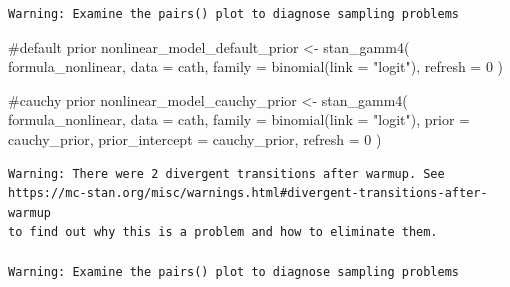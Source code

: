 \documentclass[
  letterpaper,
  DIV=11,
  numbers=noendperiod]{scrartcl}
\newenvironment{Shaded}{\begin{snugshade}}{\end{snugshade}}
\newcommand{\AttributeTok}[1]{\textcolor[rgb]{0.40,0.45,0.13}{#1}}
\newcommand{\CommentTok}[1]{\textcolor[rgb]{0.37,0.37,0.37}{#1}}
\newcommand{\DecValTok}[1]{\textcolor[rgb]{0.68,0.00,0.00}{#1}}
\newcommand{\FunctionTok}[1]{\textcolor[rgb]{0.28,0.35,0.67}{#1}}
\newcommand{\NormalTok}[1]{\textcolor[rgb]{0.00,0.23,0.31}{#1}}
\newcommand{\OtherTok}[1]{\textcolor[rgb]{0.00,0.23,0.31}{#1}}
\newcommand{\StringTok}[1]{\textcolor[rgb]{0.13,0.47,0.30}{#1}}
\begin{document}
\begin{verbatim}
Warning: Examine the pairs() plot to diagnose sampling problems
\end{verbatim}

\begin{Shaded}
\begin{Highlighting}[]
\CommentTok{\#default prior}
\NormalTok{nonlinear\_model\_default\_prior }\OtherTok{\textless{}{-}} \FunctionTok{stan\_gamm4}\NormalTok{(}
\NormalTok{  formula\_nonlinear, }\AttributeTok{data =}\NormalTok{ cath,}
  \AttributeTok{family =} \FunctionTok{binomial}\NormalTok{(}\AttributeTok{link =} \StringTok{"logit"}\NormalTok{),}
  \AttributeTok{refresh =} \DecValTok{0}
\NormalTok{)}

\CommentTok{\#cauchy prior}
\NormalTok{nonlinear\_model\_cauchy\_prior }\OtherTok{\textless{}{-}} \FunctionTok{stan\_gamm4}\NormalTok{(}
\NormalTok{  formula\_nonlinear, }\AttributeTok{data =}\NormalTok{ cath,}
  \AttributeTok{family =} \FunctionTok{binomial}\NormalTok{(}\AttributeTok{link =} \StringTok{"logit"}\NormalTok{),}
  \AttributeTok{prior =}\NormalTok{ cauchy\_prior, }\AttributeTok{prior\_intercept =}\NormalTok{ cauchy\_prior,}
  \AttributeTok{refresh =} \DecValTok{0}
\NormalTok{)}
\end{Highlighting}
\end{Shaded}

\begin{verbatim}
Warning: There were 2 divergent transitions after warmup. See
https://mc-stan.org/misc/warnings.html#divergent-transitions-after-warmup
to find out why this is a problem and how to eliminate them.

Warning: Examine the pairs() plot to diagnose sampling problems
\end{verbatim}
\end{document}
